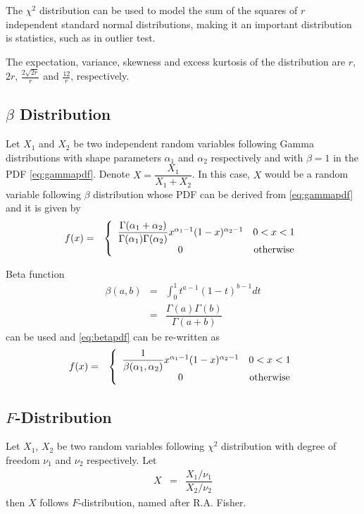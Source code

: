 The $\chi^2$ distribution can be used to model the sum of the squares of $r$ independent standard normal distributions, making it an important distribution is statistics, such as in outlier test. 

The expectation, variance, skewness and excess kurtosis of the distribution are $r$, $2r$, $\frac{2\sqrt{2r}}{r}$ and $\frac{12}{r}$, respectively.

\subsection{$\beta$ Distribution}

Let $X_1$ and $X_2$ be two independent random variables following Gamma distributions with shape parameters $\alpha_1$ and $\alpha_2$ respectively and with $\beta = 1$ in the PDF \eqref{eq:gammapdf}. Denote $X=\dfrac{X_1}{X_1+X_2}$. In this case, $X$ would be a random variable following $\beta$ distribution whose PDF can be derived from \eqref{eq:gammapdf} and it is given by
\begin{eqnarray}
	f(x) &=& \left\{\begin{array}{cc}
		\dfrac{\Gamma(\alpha_1 + \alpha_2)}{\Gamma(\alpha_1)\Gamma(\alpha_2)}x^{\alpha_1-1}(1-x)^{\alpha_2-1} & 0 < x < 1 \\
		0 & \textup{otherwise}
	\end{array}\right. \label{eq:betapdf}
\end{eqnarray}

Beta function
\begin{eqnarray}
	\beta(a, b) &=& \int_{0}^{1} t^{a-1}(1-t)^{b-1}dt \nonumber \\ 
	&=& \dfrac{\Gamma(a)\Gamma(b)}{\Gamma(a+b)} \nonumber
\end{eqnarray}
can be used and \eqref{eq:betapdf} can be re-written as
\begin{eqnarray}
	f(x) &=& \left\{\begin{array}{cc}
		\dfrac{1}{\beta(\alpha_1, \alpha_2)}x^{\alpha_1-1}(1-x)^{\alpha_2-1} & 0 < x < 1 \\
		0 & \textup{otherwise}
	\end{array}\right. \nonumber
\end{eqnarray}

\subsection{$F$-Distribution}

Let $X_1$, $X_2$ be two random variables following $\chi^2$ distribution with degree of freedom $\nu_1$ and $\nu_2$ respectively. Let
\begin{eqnarray}
	X &=& \dfrac{X_1 / \nu_1}{X_2 / \nu_2} \nonumber
\end{eqnarray}
then $X$ follows $F$-distribution, named after R.A. Fisher.

